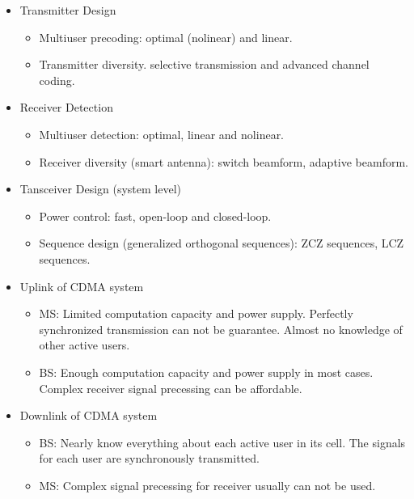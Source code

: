 \documentclass[20pt,landscape]{foils}
\begin{document}
\begin{itemize}
\item Transmitter Design

    \begin{itemize}
     \item Multiuser precoding: optimal (nolinear) and linear.
     \item Transmitter diversity. selective transmission and advanced channel
     coding.
    \end{itemize}

\item Receiver Detection

    \begin{itemize}
     \item Multiuser detection: optimal, linear and nolinear.
     \item Receiver diversity (smart antenna): switch beamform, adaptive beamform.
    \end{itemize}


\item Tansceiver Design (system level)
    \begin{itemize}
     \item Power control: fast, open-loop and closed-loop.
     \item Sequence design (generalized orthogonal sequences): ZCZ sequences, LCZ sequences.
    \end{itemize}
\end{itemize}


\begin{itemize}
\item Uplink of CDMA system

    \begin{itemize}
     \item MS: Limited computation capacity and power
     supply. Perfectly synchronized transmission can not be
     guarantee. Almost no knowledge of other active users.
     \item BS: Enough computation capacity and power
     supply in most cases. Complex receiver signal precessing can be affordable.
    \end{itemize}


\item Downlink of CDMA system

    \begin{itemize}
     \item BS: Nearly know everything about each active user in
     its cell. The signals for each user are synchronously
     transmitted.
     \item MS: Complex signal precessing for receiver usually can not be used.
    \end{itemize}

\end{itemize}
\end{document}
